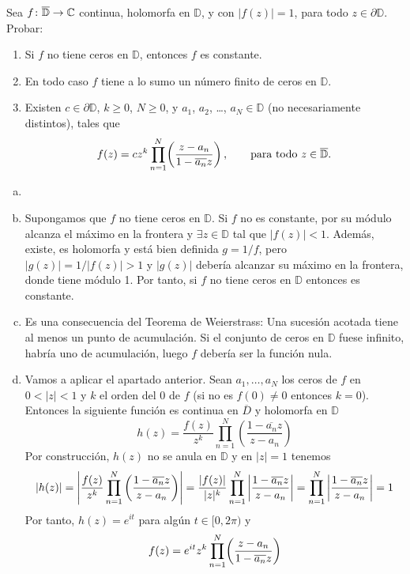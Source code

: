 \documentclass[twoside]{article}
\begin{document}
\newpage
\begin{ejercicio}{10}
Sea $f\colon\overline{\mathbb{D}} \to \mathbb{C}$ continua, holomorfa en $\mathbb{D}$, y con $|f(z)|=1$, 
para todo $z\in \partial\mathbb{D}$. Probar:
\begin{enumerate}
\item Si $f$ no tiene ceros en $\mathbb{D}$, entonces $f$ es constante.
\item En todo caso $f$ tiene a lo sumo un n\'umero finito de ceros en $\mathbb{D}$.
\item Existen $c\in\partial\mathbb{D}$, $k\ge 0$, $N\ge 0$, y $a_1$, 
$a_2$, \dots, $a_N\in\mathbb{D}$ (no necesariamente distintos), tales que
$$
f(z)=c z^k \prod_{n=1}^N \biggl({z-a_n\over 1-\overline{a_n} z}\biggr)\,,\qquad
\hbox{para todo $z\in \overline{\mathbb{D}}$.}
$$

\end{enumerate}
\end{ejercicio}
\begin{solucion}
\begin{enumerate}[a)]
\item[]
\item Supongamos que $f$ no tiene ceros en $\mathbb{D}$. Si $f$ no es constante, por su módulo alcanza el máximo en la frontera y $\exists z \in \mathbb{D}$ tal que $|f(z)|<1$. Además, existe, es holomorfa y está bien definida $g=1/f$, pero $|g(z)|=1/|f(z)| >1$ y $|g(z)|$ debería alcanzar su máximo en la frontera, donde tiene módulo 1. Por tanto, si $f$ no tiene ceros en $\mathbb{D}$ entonces es constante.
\item Es una consecuencia del Teorema de Weierstrass: Una sucesión acotada tiene al menos un punto de acumulación. Si el conjunto de ceros en $\mathbb{D}$ fuese infinito, habría uno de acumulación, luego $f$ debería ser la función nula.	
\item Vamos a aplicar el apartado anterior. Sean $a_1,\dotsc,a_N$ los ceros de $f$ en $0<|z|<1$ y $k$ el orden del $0$ de $f$ (si no es $f(0)\neq 0$ entonces $k=0$). Entonces la siguiente función es continua en $\overline{D}$ y holomorfa en $\mathbb{D}$
$$
h(z)=\frac{f(z)}{z^k}\prod_{n=1}^N \left(\frac{1-\overline{a_n}z}{z-a_n}\right)
$$
Por construcción, $h(z)$ no se anula en $\mathbb{D}$ y en $|z|=1$ tenemos
$$
|h(z)| = \left\lvert\frac{f(z)}{z^k}\prod_{n=1}^N \left(\frac{1-\overline{a_n}z}{z-a_n}\right)\right\rvert = \frac{|f(z)|}{|z|^k}\prod_{n=1}^N \left\lvert\frac{1-\overline{a_n}z}{z-a_n}\right\rvert = \prod_{n=1}^N \left\lvert\frac{1-\overline{a_n}z}{z-a_n}\right\rvert=1 
$$
Por tanto, $h(z) = e^{it}$ para algún $t\in [0,2\pi)$ y 
$$
f(z) = e^{it}z^k \prod_{n=1}^N \biggl({z-a_n\over 1-\overline{a_n} z}\biggr)
$$
\end{enumerate}
\end{solucion}
\end{document}
